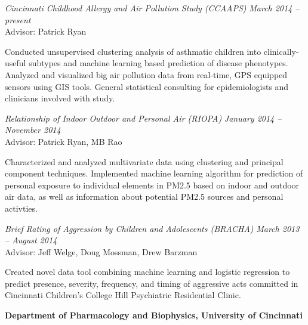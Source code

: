 \documentclass[margin,line]{res}
\newenvironment{list1}{
  \begin{list}{\ding{113}}{%
      \setlength{\itemsep}{0in}
      \setlength{\parsep}{0in} \setlength{\parskip}{0in}
      \setlength{\topsep}{0in} \setlength{\partopsep}{0in} 
      \setlength{\leftmargin}{0.17in}}}{\end{list}}
\begin{document}
\begin{resume}
\vspace{-0.2in}
\textsl{Cincinnati Childhood Allergy and Air Pollution Study (CCAAPS)}
\hfill \textit{March 2014 -- present} \\
Advisor: Patrick Ryan \\
\vspace{-0.13in}
\begin{list1}
\item[]Conducted unsupervised clustering analysis of asthmatic children into clinically-useful subtypes and machine learning based prediction of disease phenotypes. Analyzed and visualized big air pollution data from real-time, GPS equipped sensors using GIS tools. General statistical consulting for epidemiologists and clinicians involved with study. 
\end{list1}


\textsl{Relationship of Indoor Outdoor and Personal Air  (RIOPA)}
\hfill \textit{January 2014 -- November 2014} \\
Advisor: Patrick Ryan, MB Rao \\
\vspace{-0.13in}
\begin{list1}
\item[] Characterized and analyzed multivariate data using clustering and principal component techniques. Implemented machine learning algorithm for prediction of personal exposure to individual elements in PM2.5 based on indoor and outdoor air data, as well as information about potential PM2.5 sources and personal activties.
\end{list1}



\textsl{Brief Rating of Aggression by Children and Adolescents (BRACHA)}
\hfill \textit{March 2013 -- August 2014} \\
Advisor: Jeff Welge, Doug Mossman, Drew Barzman \\
\vspace{-0.13in}
\begin{list1}
\item[] Created novel data tool combining machine learning and logistic regression to predict presence, severity, frequency, and timing of aggressive acts committed in Cincinnati Children's College Hill Psychiatric Residential Clinic.
\end{list1}

 
\textbf{Department of Pharmacology and Biophysics, University of Cincinnati} \\


\end{resume}
\end{document}

